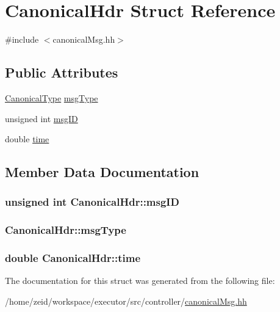 \hypertarget{struct_canonical_hdr}{
\section{CanonicalHdr Struct Reference}
\label{struct_canonical_hdr}
}


{\ttfamily \#include $<$canonicalMsg.hh$>$}

\subsection*{Public Attributes}
\begin{DoxyCompactItemize}
\item 
\hyperlink{canonical_msg_8hh_a82f10f8fe974cf1c4a8c7459b963ffeb}{CanonicalType} \hyperlink{struct_canonical_hdr_a4c1a01e866dec61d147928ab40d1f292}{msgType}
\item 
unsigned int \hyperlink{struct_canonical_hdr_a0f1e839eeb5d1734e500b21db24ae808}{msgID}
\item 
double \hyperlink{struct_canonical_hdr_aa661c4ed91f577d0b0986aac7fd0c84e}{time}
\end{DoxyCompactItemize}


\subsection{Member Data Documentation}
\hypertarget{struct_canonical_hdr_a0f1e839eeb5d1734e500b21db24ae808}{
\subsubsection[{msgID}]{\setlength{\rightskip}{0pt plus 5cm}unsigned int {\bf CanonicalHdr::msgID}}}
\label{struct_canonical_hdr_a0f1e839eeb5d1734e500b21db24ae808}
\hypertarget{struct_canonical_hdr_a4c1a01e866dec61d147928ab40d1f292}{
\subsubsection[{msgType}]{ {\bf CanonicalHdr::msgType}}}
\label{struct_canonical_hdr_a4c1a01e866dec61d147928ab40d1f292}
\hypertarget{struct_canonical_hdr_aa661c4ed91f577d0b0986aac7fd0c84e}{
\subsubsection[{time}]{\setlength{\rightskip}{0pt plus 5cm}double {\bf CanonicalHdr::time}}}
\label{struct_canonical_hdr_aa661c4ed91f577d0b0986aac7fd0c84e}


The documentation for this struct was generated from the following file:\begin{DoxyCompactItemize}
\item 
/home/zeid/workspace/executor/src/controller/\hyperlink{canonical_msg_8hh}{canonicalMsg.hh}\end{DoxyCompactItemize}
